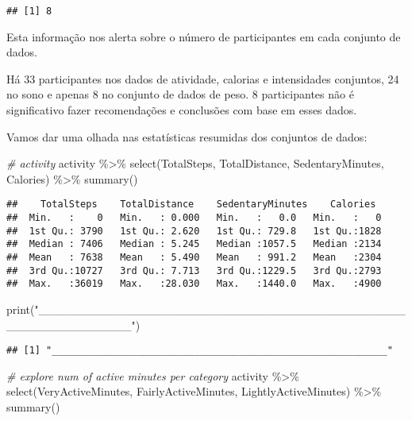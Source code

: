 \documentclass[
]{article}
\newenvironment{Shaded}{\begin{snugshade}}{\end{snugshade}}
\newcommand{\CommentTok}[1]{\textcolor[rgb]{0.56,0.35,0.01}{\textit{#1}}}
\newcommand{\FunctionTok}[1]{\textcolor[rgb]{0.00,0.00,0.00}{#1}}
\newcommand{\NormalTok}[1]{#1}
\newcommand{\SpecialCharTok}[1]{\textcolor[rgb]{0.00,0.00,0.00}{#1}}
\newcommand{\StringTok}[1]{\textcolor[rgb]{0.31,0.60,0.02}{#1}}
\begin{document}
\begin{verbatim}
## [1] 8
\end{verbatim}

Esta informação nos alerta sobre o número de participantes em cada
conjunto de dados.

Há 33 participantes nos dados de atividade, calorias e intensidades
conjuntos, 24 no sono e apenas 8 no conjunto de dados de peso. 8
participantes não é significativo fazer recomendações e conclusões com
base em esses dados.

Vamos dar uma olhada nas estatísticas resumidas dos conjuntos de dados:

\begin{Shaded}
\begin{Highlighting}[]
\CommentTok{\# activity}
\NormalTok{activity }\SpecialCharTok{\%\textgreater{}\%}  
  \FunctionTok{select}\NormalTok{(TotalSteps,}
\NormalTok{         TotalDistance,}
\NormalTok{         SedentaryMinutes, Calories) }\SpecialCharTok{\%\textgreater{}\%}
  \FunctionTok{summary}\NormalTok{()}
\end{Highlighting}
\end{Shaded}

\begin{verbatim}
##    TotalSteps    TotalDistance    SedentaryMinutes    Calories   
##  Min.   :    0   Min.   : 0.000   Min.   :   0.0   Min.   :   0  
##  1st Qu.: 3790   1st Qu.: 2.620   1st Qu.: 729.8   1st Qu.:1828  
##  Median : 7406   Median : 5.245   Median :1057.5   Median :2134  
##  Mean   : 7638   Mean   : 5.490   Mean   : 991.2   Mean   :2304  
##  3rd Qu.:10727   3rd Qu.: 7.713   3rd Qu.:1229.5   3rd Qu.:2793  
##  Max.   :36019   Max.   :28.030   Max.   :1440.0   Max.   :4900
\end{verbatim}

\begin{Shaded}
\begin{Highlighting}[]
\FunctionTok{print}\NormalTok{(}\StringTok{"\_\_\_\_\_\_\_\_\_\_\_\_\_\_\_\_\_\_\_\_\_\_\_\_\_\_\_\_\_\_\_\_\_\_\_\_\_\_\_\_\_\_\_\_\_\_\_\_\_\_\_\_\_\_\_\_\_\_\_"}\NormalTok{)}
\end{Highlighting}
\end{Shaded}

\begin{verbatim}
## [1] "___________________________________________________________"
\end{verbatim}

\begin{Shaded}
\begin{Highlighting}[]
\CommentTok{\# explore num of active minutes per category}
\NormalTok{activity }\SpecialCharTok{\%\textgreater{}\%}
  \FunctionTok{select}\NormalTok{(VeryActiveMinutes, FairlyActiveMinutes, LightlyActiveMinutes) }\SpecialCharTok{\%\textgreater{}\%}
  \FunctionTok{summary}\NormalTok{()}
\end{Highlighting}
\end{Shaded}
\end{document}
